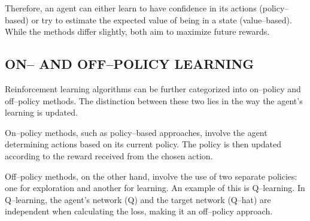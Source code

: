 \documentclass{article}
\renewenvironment{leftbar}[1][\hsize]{
    \def\FrameCommand{{\color{barcolor}\vrule width 0.5pt \hspace{10pt}}}
    \MakeFramed{\hsize#1 \advance\hsize-\width \FrameRestore}
}{\endMakeFramed}
\begin{document}
Therefore, an agent can either learn to have confidence in its actions (policy–based) or try to estimate the expected value of being in a state (value–based). While the methods differ slightly, both aim to maximize future rewards.

\subsection*{\normalsize ON– AND OFF–POLICY LEARNING}
\begin{leftbar}
    Reinforcement learning algorithms can be further categorized into on–policy and off–policy methods. The distinction between these two lies in the way the agent's learning is updated.

    On–policy methods, such as policy–based approaches, involve the agent determining actions based on its current policy. The policy is then updated according to the reward received from the chosen action.

    Off–policy methods, on the other hand, involve the use of two separate policies: one for exploration and another for learning. An example of this is Q–learning. In Q–learning, the agent's network (Q) and the target network (Q–hat) are independent when calculating the loss, making it an off–policy approach.
\end{leftbar}
\end{document}
